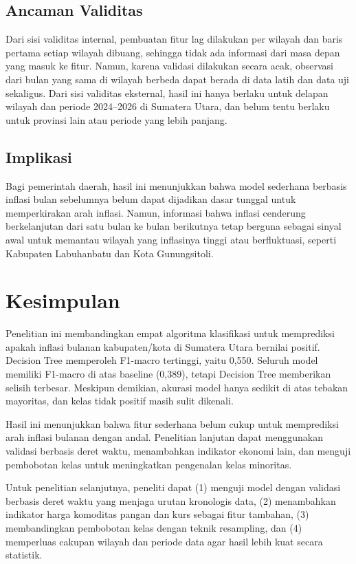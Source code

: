 \documentclass[conference]{IEEEtran}
\begin{document}
\subsection{Ancaman Validitas}
Dari sisi validitas internal, pembuatan fitur lag dilakukan per wilayah dan baris pertama setiap wilayah dibuang, sehingga tidak ada informasi dari masa depan yang masuk ke fitur. Namun, karena validasi dilakukan secara acak, observasi dari bulan yang sama di wilayah berbeda dapat berada di data latih dan data uji sekaligus. Dari sisi validitas eksternal, hasil ini hanya berlaku untuk delapan wilayah dan periode 2024--2026 di Sumatera Utara, dan belum tentu berlaku untuk provinsi lain atau periode yang lebih panjang.

\subsection{Implikasi}
Bagi pemerintah daerah, hasil ini menunjukkan bahwa model sederhana berbasis inflasi bulan sebelumnya belum dapat dijadikan dasar tunggal untuk memperkirakan arah inflasi. Namun, informasi bahwa inflasi cenderung berkelanjutan dari satu bulan ke bulan berikutnya tetap berguna sebagai sinyal awal untuk memantau wilayah yang inflasinya tinggi atau berfluktuasi, seperti Kabupaten Labuhanbatu dan Kota Gunungsitoli.

\section{Kesimpulan}
Penelitian ini membandingkan empat algoritma klasifikasi untuk memprediksi apakah inflasi bulanan kabupaten/kota di Sumatera Utara bernilai positif. Decision Tree memperoleh F1-macro tertinggi, yaitu 0,550. Seluruh model memiliki F1-macro di atas baseline (0,389), tetapi Decision Tree memberikan selisih terbesar. Meskipun demikian, akurasi model hanya sedikit di atas tebakan mayoritas, dan kelas tidak positif masih sulit dikenali.

Hasil ini menunjukkan bahwa fitur sederhana belum cukup untuk memprediksi arah inflasi bulanan dengan andal. Penelitian lanjutan dapat menggunakan validasi berbasis deret waktu, menambahkan indikator ekonomi lain, dan menguji pembobotan kelas untuk meningkatkan pengenalan kelas minoritas.

Untuk penelitian selanjutnya, peneliti dapat (1) menguji model dengan validasi berbasis deret waktu yang menjaga urutan kronologis data, (2) menambahkan indikator harga komoditas pangan dan kurs sebagai fitur tambahan, (3) membandingkan pembobotan kelas dengan teknik resampling, dan (4) memperluas cakupan wilayah dan periode data agar hasil lebih kuat secara statistik.
\end{document}
